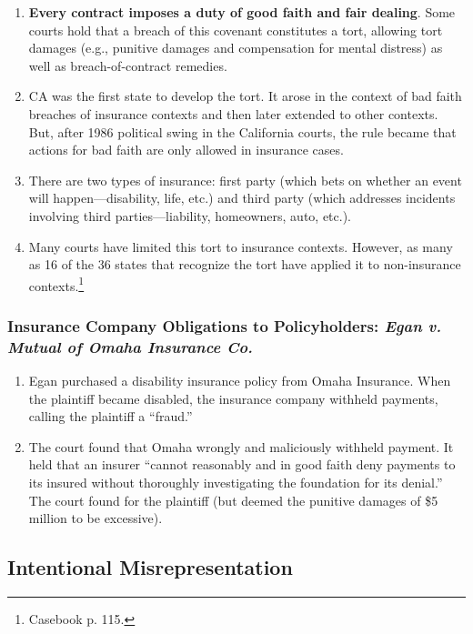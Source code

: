 \begin{enumerate}
    \item \textbf{Every contract imposes a duty of good faith and fair dealing}. Some 
    courts hold that a breach of this covenant constitutes a tort, allowing 
    tort damages (e.g., punitive damages and compensation for mental distress) 
    as well as breach-of-contract remedies.
    \item CA was the first state to develop the tort. It arose in the context 
    of bad faith breaches of insurance contexts and then later extended to 
    other contexts. But, after 1986 political swing in the California courts, 
    the rule became that actions for bad faith are only allowed in insurance 
    cases.
    \item There are two types of insurance: first party (which bets on whether an event 
    will happen---disability, life, etc.) and third party (which addresses 
    incidents involving third parties---liability, homeowners, auto, etc.).
    \item Many courts have limited this tort to insurance contexts. However, 
    as many as 16 of the 36 states that recognize the tort have applied it to 
    non-insurance contexts.\footnote{Casebook p. 115.}
\end{enumerate}

\subsubsection{Insurance Company Obligations to Policyholders: \emph{Egan v. 
Mutual of Omaha Insurance Co.}}

\begin{enumerate}
    \item Egan purchased a disability insurance policy from Omaha Insurance. 
    When the plaintiff became disabled, the insurance company  withheld 
    payments, calling the plaintiff a ``fraud.''
    \item The court found that Omaha wrongly and maliciously withheld payment. 
    It held that an insurer ``cannot reasonably and in good faith deny 
    payments to its insured without thoroughly investigating the foundation 
    for its denial.'' The court found for the plaintiff (but deemed the 
    punitive damages of \$5 million to be excessive).
\end{enumerate}

\subsection{Intentional Misrepresentation}

